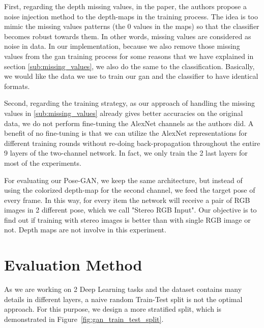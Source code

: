 First, regarding the depth missing values, in the paper, the authors propose a noise
injection method to the depth-maps in the training process. The idea is too mimic the
missing values patterns (the 0 values in the maps) so that the classifier becomes robust
towards them. In other words, missing values are considered as noise in data. In our
implementation, because we also remove those missing values from the \acrshort{gan}
training process for some reasons that we have explained in section
\ref{sub:missing_values}, we also do the same to the classification. Basically, we would
like the data we use to train our \acrshort{gan} and the classifier to have identical
formats.

Second, regarding the training strategy, as our approach of handling the missing values in
\ref{sub:missing_values} already gives better accuracies on the original data, we do not
perform fine-tuning the AlexNet channels as the authors did. A benefit of no fine-tuning
is that we can utilize the AlexNet representations for different training rounds without
re-doing back-propagation throughout the entire 9 layers of the two-channel network. In
fact, we only train the 2 last layers for most of the experiments.

For evaluating our Pose-GAN, we keep the same architecture, but instead of using the
colorized depth-map for the second channel, we feed the target pose of every frame. In
this way, for every item the network will receive a pair of RGB images in 2 different
pose, which we call "Stereo RGB Input". Our objective is to find out if training with 
stereo images is better than with single RGB image or not. Depth maps are not involve in
this experiment.

\section{Evaluation Method \label{sec:train_test_split}}
As we are working on 2 Deep Learning tasks and the dataset contains many details in
different layers, a naive random Train-Test split is not the optimal approach. For this
purpose, we design a more stratified split, which is demonstrated in
Figure~\ref{fig:gan_train_test_split}.

